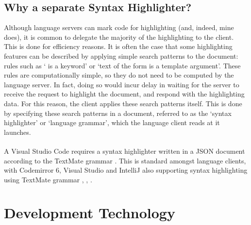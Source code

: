 \documentclass[../main.tex]{subfiles}
\begin{document}
\subsection{Why a separate Syntax Highlighter?}
Although language servers can mark code for highlighting (and, indeed, mine does), it is common to delegate the majority of the highlighting to the client. This is done for efficiency reasons. It is often the case that some highlighting features can be described by applying simple search patterns to the document: rules such as ` is a keyword' or `text of the form  is a template argument'. These rules are computationally simple, so they do not need to be computed by the language server. In fact, doing so would incur delay in waiting for the server to receive the request to highlight the document, and respond with the highlighting data. For this reason, the client applies these search patterns itself. This is done by specifying these search patterns in a document, referred to as the `syntax highlighter' or `language grammar', which the language client reads at it launches.
\\
\\
A Visual Studio Code requires a syntax highlighter written in a JSON document according to the TextMate grammar \cite{textmate_grammars_spec}. This is standard amongst language clients, with Codemirror 6, Visual Studio and IntelliJ also supporting syntax highlighting using TextMate grammar \cite{codemirror_textmate}, \cite{visual_studio_textmate}, \cite{intellij_textmate}.
%
%
%
\section{Development Technology}
\end{document}
